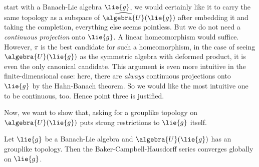 \documentclass[
11pt,                          %
english                        %
]{article}
\begin{document}
start with a Banach-Lie algebra $\lie{g}$, we would certainly like it to carry the 
same topology as a subspace of $\widehat{\algebra{U}}(\lie{g})$ after embedding it 
and taking the completion, everything else seems pointless. But we do not need a 
\emph{continuous projection} onto $\lie{g}$. A linear homeomorphism would suffice. 
However, $\pi$ is the best candidate for such a homeomorphism, in the case of seeing 
$\algebra{U}(\lie{g})$ as the symmetric algebra with deformed product, it is even 
the only canonical candidate. This argument is even more intuitive in the 
finite-dimensional case: here, there are \emph{always} continuous projections onto 
$\lie{g}$ by the Hahn-Banach theorem. So we would like the most intuitive one to be 
continuous, too. Hence point three is justified.

Now, we want to show that, asking for a grouplike topology on $\algebra{U}(\lie{g})$ 
puts strong restrictions to $\lie{g}$ itself.
\begin{proposition}
	Let $\lie{g}$ be a Banach-Lie algebra and $\algebra{U}(\lie{g})$ has an 
	grouplike topology. Then the Baker-Campbell-Hausdorff series converges globally 
	on $\lie{g}$.
\end{proposition}
\end{document}
